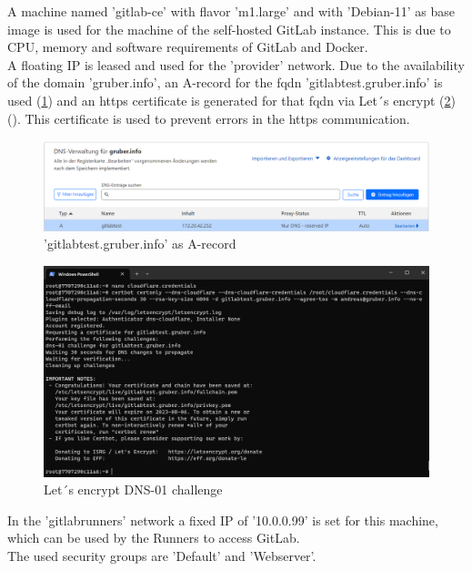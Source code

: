 A machine named 'gitlab-ce' with flavor 'm1.large' and with 'Debian-11' as base image is used for the machine of the self-hosted GitLab instance.
This is due to CPU, memory and software requirements of GitLab and Docker.\\

A floating IP is leased and used for the 'provider' network.
Due to the availability of the domain 'gruber.info', an A-record for the \ac{fqdn} 'gitlabtest.gruber.info' is used (\ref{fig:a_record}) and an https certificate is generated for that \ac{fqdn} via Let´s encrypt (\ref{fig:lets_encrypt}) (\cite{refCloudflareCertbot}).
This certificate is used to prevent errors in the https communication.
\begin{figure}[H]
	\centering
	\includegraphics[width=14cm]{images/a-record.png}
	\caption{'gitlabtest.gruber.info' as A-record}
	\label{fig:a_record}
\end{figure}

\begin{figure}[H]
	\centering
	\includegraphics[width=14cm]{images/lets_encrypt.png}
	\caption{Let´s encrypt DNS-01 challenge}
	\label{fig:lets_encrypt}
\end{figure}

In the 'gitlabrunners' network a fixed IP of '10.0.0.99' is set for this machine, which can be used by the Runners to access GitLab.\\

The used security groups are 'Default' and 'Webserver'.\\

